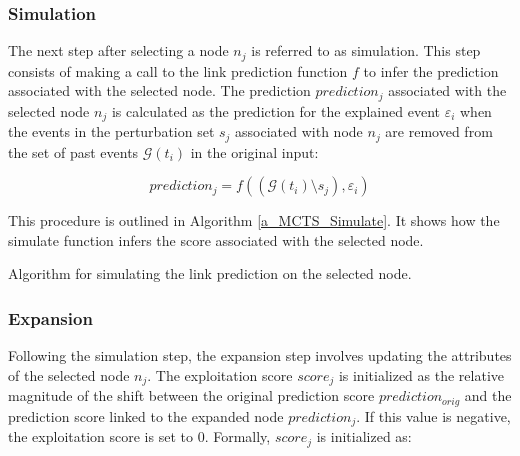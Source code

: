 \FloatBarrier
\subsubsection{Simulation}
\label{s_Methodology_CoDy_Simulation}
The next step after selecting a node $n_j$ is referred to as simulation. This step consists of making a call to the link prediction function $f$ to infer the prediction associated with the selected node. The prediction $prediction_j$ associated with the selected node $n_j$ is calculated as the prediction for the explained event $\varepsilon_i$ when the events in the perturbation set $s_j$ associated with node $n_j$ are removed from the set of past events $\mathcal{G}(t_i)$ in the original input:

\begin{equation}
    prediction_j = f((\mathcal{G}(t_i) \setminus s_j), \varepsilon_i)
\end{equation}

This procedure is outlined in Algorithm \ref{a_MCTS_Simulate}. It shows how the simulate function infers the score associated with the selected node. %

{
\setlength{\algomargin}{1.25em}
\small
\begin{algorithm}[ht]
\caption{Algorithm for simulating the link prediction on the selected node.}
\label{a_MCTS_Simulate}
\end{algorithm}
}

\FloatBarrier
\subsubsection{Expansion}
\label{s_Methodology_CoDy_Expansion}

Following the simulation step, the expansion step involves updating the attributes of the selected node $n_j$. The exploitation score $score_j$ is initialized as the relative magnitude of the shift between the original prediction score $prediction_{orig}$ and the prediction score linked to the expanded node $prediction_j$. If this value is negative, the exploitation score is set to $0$. Formally, $score_j$ is initialized as:

